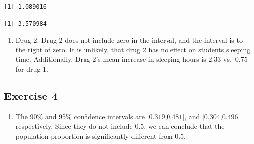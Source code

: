 \documentclass[
  letterpaper,
  DIV=11,
  numbers=noendperiod]{scrreprt}
\newenvironment{Shaded}{\begin{snugshade}}{\end{snugshade}}
\newcommand{\DecValTok}[1]{\textcolor[rgb]{0.68,0.00,0.00}{#1}}
\newcommand{\FloatTok}[1]{\textcolor[rgb]{0.68,0.00,0.00}{#1}}
\newcommand{\FunctionTok}[1]{\textcolor[rgb]{0.28,0.35,0.67}{#1}}
\newcommand{\NormalTok}[1]{\textcolor[rgb]{0.00,0.23,0.31}{#1}}
\newcommand{\OtherTok}[1]{\textcolor[rgb]{0.00,0.23,0.31}{#1}}
\newcommand{\SpecialCharTok}[1]{\textcolor[rgb]{0.37,0.37,0.37}{#1}}
\providecommand{\tightlist}{%
  \setlength{\itemsep}{0pt}\setlength{\parskip}{0pt}}\usepackage{longtable,booktabs,array}
\begin{document}
\begin{verbatim}
[1] 1.089016
\end{verbatim}

\begin{Shaded}
\end{Shaded}

\begin{verbatim}
[1] 3.570984
\end{verbatim}

\begin{blackbox}

\begin{enumerate}
\def\labelenumi{\arabic{enumi}.}
\setcounter{enumi}{2}
\tightlist
\item
  Drug 2. Drug 2 does not include zero in the interval, and the interval
  is to the right of zero. It is unlikely, that drug 2 has no effect on
  students sleeping time. Additionally, Drug 2's mean increase in
  sleeping hours is \(2.33\) vs.~\(0.75\) for drug 1.
\end{enumerate}

\end{blackbox}

\hypertarget{exercise-4-11}{%
\subsection*{Exercise 4}\label{exercise-4-11}}

\begin{blackbox}

\begin{enumerate}
\def\labelenumi{\arabic{enumi}.}
\tightlist
\item
  The 90\% and 95\% confidence intervals are {[}\(0.319\),\(0.481\){]},
  and {[}\(0.304\),\(0.496\){]} respectively. Since they do not include
  0.5, we can conclude that the population proportion is significantly
  different from 0.5.
\end{enumerate}

\end{blackbox}
\end{document}
